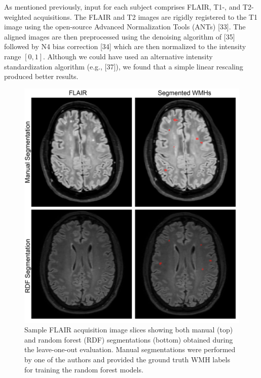 \documentclass[11pt,]{article}
\begin{document}
As mentioned previously, input for each subject comprises FLAIR, T1-,
and T2-weighted acquisitions. The FLAIR and T2 images are rigidly
registered to the T1 image using the open-source Advanced Normalization
Tools (ANTs) {[}33{]}. The aligned images are then preprocessed using
the denoising algorithm of {[}35{]} followed by N4 bias correction
{[}34{]} which are then normalized to the intensity range \([0,1]\).
Although we could have used an alternative intensity standardization
algorithm (e.g., {[}37{]}), we found that a simple linear rescaling
produced better results.

\begin{figure}[htbp]
\centering
\includegraphics{Figures/montage.png}
\caption{Sample FLAIR acquisition image slices showing both manual (top)
and random forest (RDF) segmentations (bottom) obtained during the
leave-one-out evaluation. Manual segmentations were performed by one of
the authors and provided the ground truth WMH labels for training the
random forest models.}
\end{figure}
\end{document}
